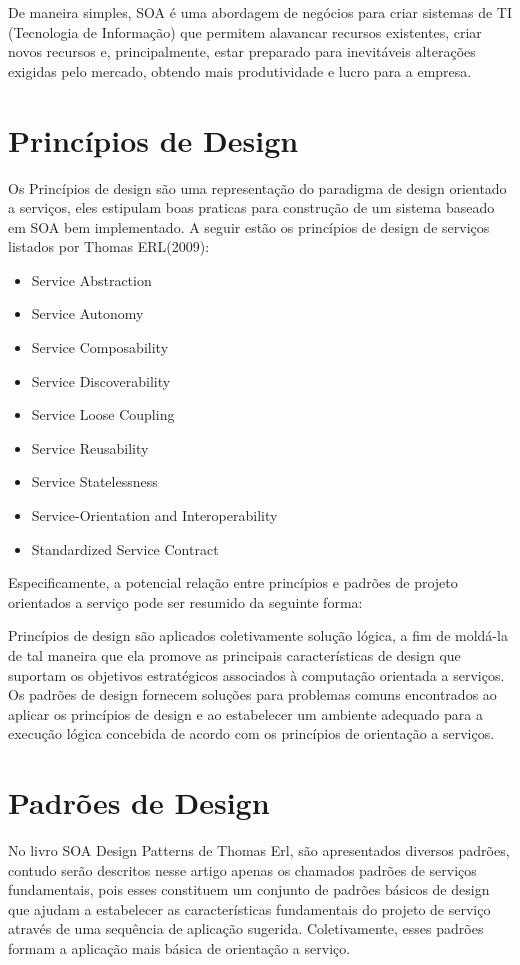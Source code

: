 \documentclass[12pt]{article}
\begin{document}
De maneira simples, SOA é uma abordagem de negócios para criar sistemas de TI (Tecnologia de Informação) que permitem alavancar recursos existentes, criar novos recursos e, principalmente, estar preparado para inevitáveis alterações exigidas pelo mercado, obtendo mais produtividade e lucro para a empresa.


\section{Princípios de Design} 

Os Princípios de design são uma representação do paradigma de design orientado a serviços, eles estipulam boas praticas para construção de um sistema baseado em SOA bem implementado. A seguir estão os princípios de design de serviços listados por Thomas ERL(2009):

\begin{itemize}
\item Service Abstraction
\item Service Autonomy
\item Service Composability 
\item Service Discoverability
\item Service Loose Coupling
\item Service Reusability
\item Service Statelessness
\item Service-Orientation and Interoperability
\item Standardized Service Contract
\end{itemize}

Especificamente, a potencial relação entre princípios e padrões de projeto orientados a serviço pode ser resumido da seguinte forma:

    Princípios de design são aplicados coletivamente solução lógica, a fim de moldá-la de tal maneira que ela promove as principais características de design que suportam os objetivos estratégicos associados à computação orientada a serviços.
   Os padrões de design fornecem soluções para problemas comuns encontrados ao aplicar os princípios de design e ao estabelecer um ambiente adequado para a execução lógica concebida de acordo com os princípios de orientação a serviços.

\section{Padrões de Design}

No livro SOA Design Patterns de Thomas Erl, são apresentados diversos padrões, contudo serão descritos nesse artigo apenas os chamados padrões de serviços fundamentais, pois esses constituem um conjunto de padrões básicos de design que ajudam a estabelecer as características fundamentais do projeto de serviço através de uma sequência de aplicação sugerida. Coletivamente, esses padrões formam a aplicação mais básica de orientação a serviço.
\end{document}
